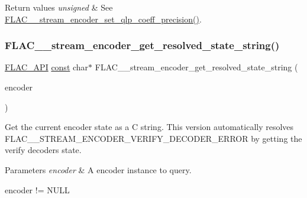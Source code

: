 \begin{DoxyRetVals}{Return values}
{\em unsigned} & See \hyperlink{group__flac__stream__encoder_ga0888d739c952ff73456bf90e48634514}{F\+L\+A\+C\+\_\+\+\_\+stream\+\_\+encoder\+\_\+set\+\_\+qlp\+\_\+coeff\+\_\+precision()}. \\
\hline
\end{DoxyRetVals}
\mbox{\label{group__flac__stream__encoder_gac909fca7b0e2aacaf772f3aa0e42c0db}} 
\subsubsection{\texorpdfstring{F\+L\+A\+C\+\_\+\+\_\+stream\+\_\+encoder\+\_\+get\+\_\+resolved\+\_\+state\+\_\+string()}{FLAC\_\_stream\_encoder\_get\_resolved\_state\_string()}}
{\footnotesize\ttfamily \hyperlink{group__flac__export_ga56ca07df8a23310707732b1c0007d6f5}{F\+L\+A\+C\+\_\+\+A\+PI} \hyperlink{zconf_8h_a2c212835823e3c54a8ab6d95c652660e}{const} char$\ast$ F\+L\+A\+C\+\_\+\+\_\+stream\+\_\+encoder\+\_\+get\+\_\+resolved\+\_\+state\+\_\+string (\begin{DoxyParamCaption}\item[{\hyperlink{zconf_8h_a2c212835823e3c54a8ab6d95c652660e}{const} \hyperlink{struct_f_l_a_c_____stream_encoder}{F\+L\+A\+C\+\_\+\+\_\+\+Stream\+Encoder} $\ast$}]{encoder }\end{DoxyParamCaption})}

Get the current encoder state as a C string. This version automatically resolves {\ttfamily F\+L\+A\+C\+\_\+\+\_\+\+S\+T\+R\+E\+A\+M\+\_\+\+E\+N\+C\+O\+D\+E\+R\+\_\+\+V\+E\+R\+I\+F\+Y\+\_\+\+D\+E\+C\+O\+D\+E\+R\+\_\+\+E\+R\+R\+OR} by getting the verify decoder\textquotesingle{}s state.


\begin{DoxyParams}{Parameters}
{\em encoder} & A encoder instance to query.  
\begin{DoxyCode}
encoder != NULL 
\end{DoxyCode}
 \\
\hline
\end{DoxyParams}

